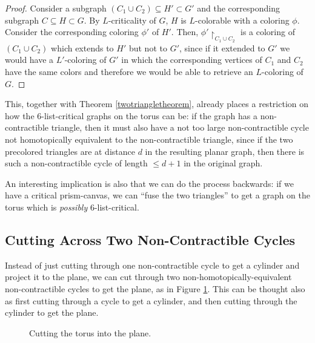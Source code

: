 \begin{proof}
Consider a subgraph $(C_1 \cup C_2) \subseteq H' \subset G'$ and
the corresponding subgraph $C \subseteq H \subset G$. 
By $L$-criticality of $G$, $H$ is $L$-colorable with a coloring $\phi$.
Consider the corresponding coloring $\phi'$ of $H'$.
 Then, $\phi'\restriction_{C_1 \cup C_2}$
is a coloring of $(C_1 \cup C_2)$ which extends to $H'$ but not to $G'$, since if it extended
to $G'$ we would have a $L'$-coloring of $G'$ in which the corresponding vertices of $C_1$ and
$C_2$ have the same colors and therefore we would be able to retrieve an $L$-coloring of $G$.
\end{proof}

This, together with Theorem \ref{twotriangletheorem}, already places a restriction on how the
$6$-list-critical graphs on the torus can be: if the graph has a non-contractible triangle, then
it must also have a not too large non-contractible cycle not homotopically equivalent to 
the non-contractible triangle, since if the two precolored triangles are at distance $d$ in the
resulting planar graph, then there is such a non-contractible cycle of length $\leq d+1$ in the
original graph. 

An interesting implication is also that we can do the process backwards: if we have a critical 
prism-canvas, we can ``fuse the two triangles'' to get a graph on the torus which is 
\emph{possibly} $6$-list-critical.   

\subsection{Cutting Across Two Non-Contractible Cycles}

Instead of just cutting through one non-contractible cycle to get a cylinder and project it to the
plane, we can cut through two non-homotopically-equivalent non-contractible cycles to get the 
plane, as in Figure \ref{fig:twocycles_illustration}. This can be thought also as first cutting 
through a cycle to get a cylinder, and then cutting through the cylinder to get the plane. 

\begin{figure}
\label{fig:twocycles_illustration}
\centering
{}
\caption{Cutting the torus into the plane.}
\end{figure}

